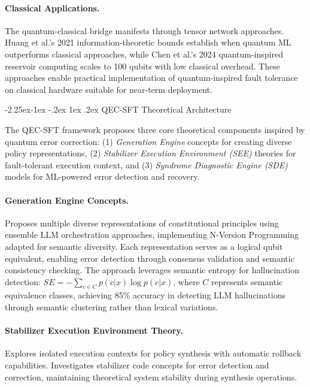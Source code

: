 \documentclass[manuscript,screen,9pt]{acmart}
\makeatletter
\renewcommand\subsection{\@startsection{subsection}{2}{\z@}%
  {-2.25ex\@plus -1ex \@minus -.2ex}%
  {1ex \@plus .2ex}%
  {\normalfont\large\bfseries}}
\makeatother
\begin{document}
\paragraph{Classical Applications.} The quantum-classical bridge manifests through tensor network approaches. Huang et al.'s 2021 information-theoretic bounds \cite{Huang2021QuantumML} establish when quantum ML outperforms classical approaches, while Chen et al.'s 2024 quantum-inspired reservoir computing \cite{Chen2024QuantumReservoir} scales to 100 qubits with low classical overhead. These approaches enable practical implementation of quantum-inspired fault tolerance on classical hardware suitable for near-term deployment.

\subsection{QEC-SFT Theoretical Architecture}
\label{subsec:qec_sft_architecture}

The QEC-SFT framework proposes three core theoretical components inspired by quantum error correction: (1) \textit{Generation Engine} concepts for creating diverse policy representations, (2) \textit{Stabilizer Execution Environment (SEE)} theories for fault-tolerant execution context, and (3) \textit{Syndrome Diagnostic Engine (SDE)} models for ML-powered error detection and recovery.

\paragraph{Generation Engine Concepts.} Proposes multiple diverse representations of constitutional principles using ensemble LLM orchestration approaches, implementing N-Version Programming adapted for semantic diversity. Each representation serves as a logical qubit equivalent, enabling error detection through consensus validation and semantic consistency checking. The approach leverages semantic entropy for hallucination detection: $SE = -\sum_{c \in C} p(c|x) \log p(c|x)$, where $C$ represents semantic equivalence classes, achieving 85\% accuracy in detecting LLM hallucinations through semantic clustering rather than lexical variations.

\paragraph{Stabilizer Execution Environment Theory.} Explores isolated execution contexts for policy synthesis with automatic rollback capabilities. Investigates stabilizer code concepts for error detection and correction, maintaining theoretical system stability during synthesis operations.
\end{document}
